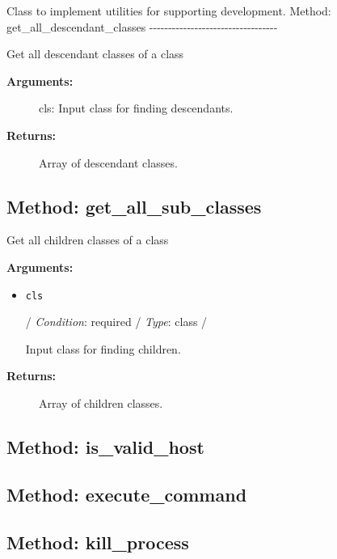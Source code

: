 Class to implement utilities for supporting development. Method:
get\_all\_descendant\_classes
-\/-\/-\/-\/-\/-\/-\/-\/-\/-\/-\/-\/-\/-\/-\/-\/-\/-\/-\/-\/-\/-\/-\/-\/-\/-\/-\/-\/-\/-\/-\/-\/-\/-

Get all descendant classes of a class

\begin{description}
\item[\textbf{Arguments:}]
cls: Input class for finding descendants.
\item[\textbf{Returns:}]
Array of descendant classes.
\end{description}

\hypertarget{qconnectbase-utils-method-get_all_sub_classes-80}{%
\subsection{Method:
get\_all\_sub\_classes}\label{qconnectbase-utils-method-get_all_sub_classes-80}}

Get all children classes of a class

\textbf{Arguments:}

\begin{itemize}
\item
  \texttt{cls}

  / \emph{Condition}: required / \emph{Type}: class /

  Input class for finding children.
\end{itemize}

\begin{description}
\item[\textbf{Returns:}]
Array of children classes.
\end{description}

\hypertarget{qconnectbase-utils-method-is_valid_host-81}{%
\subsection{Method: is\_valid\_host}\label{qconnectbase-utils-method-is_valid_host-81}}

\hypertarget{qconnectbase-utils-method-execute_command-82}{%
\subsection{Method: execute\_command}\label{qconnectbase-utils-method-execute_command-82}}

\hypertarget{qconnectbase-utils-method-kill_process-83}{%
\subsection{Method: kill\_process}\label{qconnectbase-utils-method-kill_process-83}}


